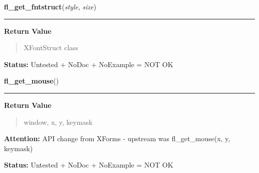     \label{xformslib:library:fl_get_fontstruct}

    \vspace{0.5ex}

\hspace{.8\funcindent}\begin{boxedminipage}{\funcwidth}

    \raggedright \textbf{fl\_get\_fntstruct}(\textit{style}, \textit{size})

    \vspace{-1.5ex}

    \rule{\textwidth}{0.5\fboxrule}
\setlength{\parskip}{2ex}
\setlength{\parskip}{1ex}
      \textbf{Return Value}
    \vspace{-1ex}

      \begin{quote}
      XFontStruct class

      \end{quote}

\textbf{Status:} Untested + NoDoc + NoExample = NOT OK



    \end{boxedminipage}

    \label{xformslib:library:fl_get_mouse}

    \vspace{0.5ex}

\hspace{.8\funcindent}\begin{boxedminipage}{\funcwidth}

    \raggedright \textbf{fl\_get\_mouse}()

    \vspace{-1.5ex}

    \rule{\textwidth}{0.5\fboxrule}
\setlength{\parskip}{2ex}
\setlength{\parskip}{1ex}
      \textbf{Return Value}
    \vspace{-1ex}

      \begin{quote}
      window, x, y, keymask

      \end{quote}

\textbf{Attention:} API change from XForms - upstream was fl\_get\_mouse(x, y, keymask)



\textbf{Status:} Untested + NoDoc + NoExample = NOT OK



    \end{boxedminipage}

